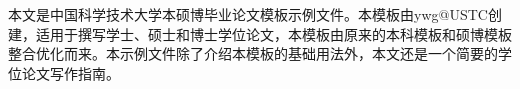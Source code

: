 \begin{cnabstract}
本文是中国科学技术大学本硕博毕业论文模板示例文件。本模板由ywg@USTC创建，适用于撰写学士、硕士和博士学位论文，本模板由原来的本科模板和硕博模板整合优化而来。本示例文件除了介绍本模板的基础用法外，本文还是一个简要的学位论文写作指南。

\end{cnabstract}

%

